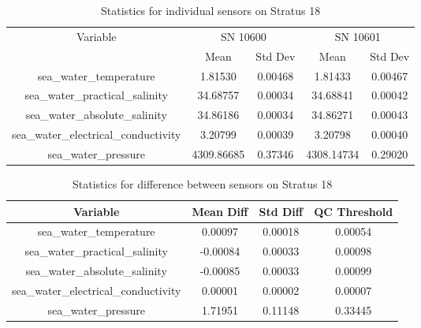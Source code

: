 \begin{table}[h]
\centering
\begin{tabular}{|c|c|c|c|c|}
\hline
Variable & \multicolumn{2}{c|}{SN 10600} & \multicolumn{2}{c|}{SN 10601} \\
& Mean & Std Dev & Mean & Std Dev \\
\hline
sea\_water\_temperature & 1.81530 & 0.00468 & 1.81433 & 0.00467 \\
sea\_water\_practical\_salinity & 34.68757 & 0.00034 & 34.68841 & 0.00042 \\
sea\_water\_absolute\_salinity & 34.86186 & 0.00034 & 34.86271 & 0.00043 \\
sea\_water\_electrical\_conductivity & 3.20799 & 0.00039 & 3.20798 & 0.00040 \\
sea\_water\_pressure & 4309.86685 & 0.37346 & 4308.14734 & 0.29020 \\
\hline
\end{tabular}
\caption{Statistics for individual sensors on Stratus 18}
\end{table}

\begin{table}[h]
\centering
\begin{tabular}{|c|c|c|c|}
\hline
Variable & Mean Diff & Std Diff & QC Threshold \\
\hline
sea\_water\_temperature & 0.00097 & 0.00018 & 0.00054 \\
sea\_water\_practical\_salinity & -0.00084 & 0.00033 & 0.00098 \\
sea\_water\_absolute\_salinity & -0.00085 & 0.00033 & 0.00099 \\
sea\_water\_electrical\_conductivity & 0.00001 & 0.00002 & 0.00007 \\
sea\_water\_pressure & 1.71951 & 0.11148 & 0.33445 \\
\hline
\end{tabular}
\caption{Statistics for difference between sensors on Stratus 18}
\end{table}
